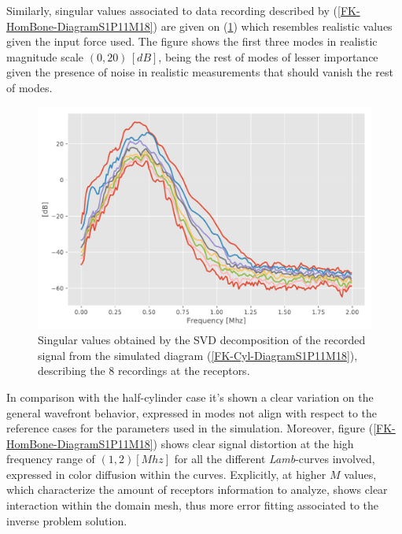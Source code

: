 Similarly, singular values associated to data recording described by (\ref{FK-HomBone-DiagramS1P11M18}) are given on (\ref{SVD-HomBone-S1P11M18}) which resembles realistic values given the input force used. The figure shows the first three modes in realistic magnitude scale $(0, 20) \, [dB]$, being the rest of modes of lesser importance given the presence of noise in realistic measurements that should vanish the rest of modes.
\begin{figure}[!h]  
	\centering
	\includegraphics[scale=.6]{images/ClusterSim/3DCorticalS1000TimeP11TransIsoFKW18_SV.pdf}
	\caption{Singular values obtained by the SVD decomposition of the recorded signal from the simulated diagram (\ref{FK-Cyl-DiagramS1P11M18}), describing the 8 recordings at the receptors.}
	\label{SVD-HomBone-S1P11M18}
\end{figure}

In comparison with the half-cylinder case it's shown a clear variation on the general wavefront behavior, expressed in modes not align with respect to the reference cases for the parameters used in the simulation. Moreover, figure (\ref{FK-HomBone-DiagramS1P11M18}) shows clear signal distortion at the high frequency range of $(1, 2) [Mhz]$ for all the different \textit{Lamb}-curves involved, expressed in color diffusion within the curves. Explicitly, at higher $M$ values, which characterize the amount of receptors information to analyze, shows clear interaction within the domain mesh, thus more error fitting associated to the inverse problem solution.

